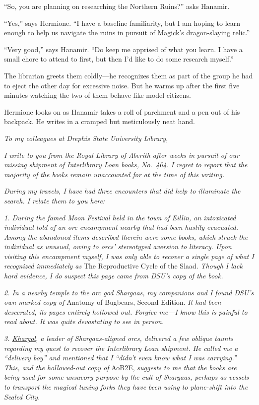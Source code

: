 \documentclass[smalldemyvopaper,11pt,twoside,onecolumn,openright,extrafontsizes]{memoir}
\begin{document}
``So, you are planning on researching the Northern Ruins?'' asks
Hanamir.

``Yes,'' says Hermione. ``I have a baseline familiarity, but I am hoping
to learn enough to help us navigate the ruins in pursuit of
\href{/characters/magick/}{Magick}'s dragon-slaying relic.''

``Very good,'' says Hanamir. ``Do keep me apprised of what you learn. I
have a small chore to attend to first, but then I'd like to do some
research myself.''

The librarian greets them coldly---he recognizes them as part of the
group he had to eject the other day for excessive noise. But he warms up
after the first five minutes watching the two of them behave like model
citizens.

Hermione looks on as Hanamir takes a roll of parchment and a pen out of
his backpack. He writes in a cramped but meticulously neat hand.

\emph{To my colleagues at Drephis State University Library,}

\emph{I write to you from the Royal Library of Aberith after weeks in
pursuit of our missing shipment of Interlibrary Loan books, No.~404. I
regret to report that the majority of the books remain unaccounted for
at the time of this writing.}

\emph{During my travels, I have had three encounters that did help to
illuminate the search. I relate them to you here:}

\emph{1. During the famed Moon Festival held in the town of Eillin, an
intoxicated individual told of an orc encampment nearby that had been
hastily evacuated. Among the abandoned items described therein were some
books, which struck the individual as unusual, owing to orcs'
stereotyped aversion to literacy. Upon visiting this encampment myself,
I was only able to recover a single page of what I recognized
immediately as} The Reproductive Cycle of the Slaad. \emph{Though I lack
hard evidence, I do suspect this page came from DSU's copy of the book.}

\emph{2. In a nearby temple to the orc god Shargaas, my companions and I
found DSU's own marked copy of} Anatomy of Bugbears, Second Edition.
\emph{It had been desecrated, its pages entirely hollowed out. Forgive
me---I know this is painful to read about. It was quite devastating to
see in person.}

\emph{3. \href{/characters/khargol/}{Khargol}, a leader of
Shargaas-aligned orcs, delivered a few oblique taunts regarding my quest
to recover the Interlibrary Loan shipment. He called me a ``delivery
boy'' and mentioned that I ``didn't even know what I was carrying.''
This, and the hollowed-out copy of} AoB2E, \emph{suggests to me that the
books are being used for some unsavory purpose by the cult of Shargaas,
perhaps as vessels to transport the magical tuning forks they have been
using to plane-shift into the Sealed City.}
\end{document}
